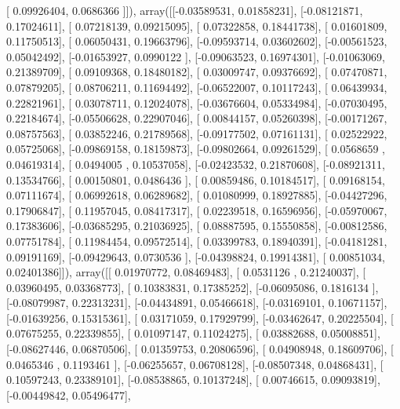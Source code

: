 \documentclass{article}
\begin{document}
       [ 0.09926404,  0.0686366 ]]), array([[-0.03589531,  0.01858231],
       [-0.08121871,  0.17024611],
       [ 0.07218139,  0.09215095],
       [ 0.07322858,  0.18441738],
       [ 0.01601809,  0.11750513],
       [ 0.06050431,  0.19663796],
       [-0.09593714,  0.03602602],
       [-0.00561523,  0.05042492],
       [-0.01653927,  0.0990122 ],
       [-0.09063523,  0.16974301],
       [-0.01063069,  0.21389709],
       [ 0.09109368,  0.18480182],
       [ 0.03009747,  0.09376692],
       [ 0.07470871,  0.07879205],
       [ 0.08706211,  0.11694492],
       [-0.06522007,  0.10117243],
       [ 0.06439934,  0.22821961],
       [ 0.03078711,  0.12024078],
       [-0.03676604,  0.05334984],
       [-0.07030495,  0.22184674],
       [-0.05506628,  0.22907046],
       [ 0.00844157,  0.05260398],
       [-0.00171267,  0.08757563],
       [ 0.03852246,  0.21789568],
       [-0.09177502,  0.07161131],
       [ 0.02522922,  0.05725068],
       [-0.09869158,  0.18159873],
       [-0.09802664,  0.09261529],
       [ 0.0568659 ,  0.04619314],
       [ 0.0494005 ,  0.10537058],
       [-0.02423532,  0.21870608],
       [-0.08921311,  0.13534766],
       [ 0.00150801,  0.0486436 ],
       [ 0.00859486,  0.10184517],
       [ 0.09168154,  0.07111674],
       [ 0.06992618,  0.06289682],
       [ 0.01080999,  0.18927885],
       [-0.04427296,  0.17906847],
       [ 0.11957045,  0.08417317],
       [ 0.02239518,  0.16596956],
       [-0.05970067,  0.17383606],
       [-0.03685295,  0.21036925],
       [ 0.08887595,  0.15550858],
       [-0.00812586,  0.07751784],
       [ 0.11984454,  0.09572514],
       [ 0.03399783,  0.18940391],
       [-0.04181281,  0.09191169],
       [-0.09429643,  0.0730536 ],
       [-0.04398824,  0.19914381],
       [ 0.00851034,  0.02401386]]), array([[ 0.01970772,  0.08469483],
       [ 0.0531126 ,  0.21240037],
       [ 0.03960495,  0.03368773],
       [ 0.10383831,  0.17385252],
       [-0.06095086,  0.1816134 ],
       [-0.08079987,  0.22313231],
       [-0.04434891,  0.05466618],
       [-0.03169101,  0.10671157],
       [-0.01639256,  0.15315361],
       [ 0.03171059,  0.17929799],
       [-0.03462647,  0.20225504],
       [ 0.07675255,  0.22339855],
       [ 0.01097147,  0.11024275],
       [ 0.03882688,  0.05008851],
       [-0.08627446,  0.06870506],
       [ 0.01359753,  0.20806596],
       [ 0.04908948,  0.18609706],
       [ 0.0465346 ,  0.1193461 ],
       [-0.06255657,  0.06708128],
       [-0.08507348,  0.04868431],
       [ 0.10597243,  0.23389101],
       [-0.08538865,  0.10137248],
       [ 0.00746615,  0.09093819],
       [-0.00449842,  0.05496477],
\end{document}
